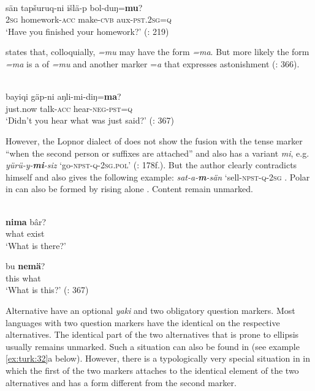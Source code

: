 \ea%
    \label{ex:turk:27}
    \\
    \gll sän  tapšuruq-ni    išlä-p    bol-duŋ=\textbf{{mu}}?\\
    2\textsc{sg}  homework-\textsc{acc} make-\textsc{cvb}  aux-\textsc{pst}.2\textsc{sg=q}\\
    \glt ‘Have you finished your homework?’ (\citealt{TuohutiLitifu2012}: 219)
    \z

\citet[56]{Shaw1878} states that, colloquially, \textit{=mu} may have the form \textit{=ma}. But more likely the form \textit{=ma} is a  of \textit{=mu} and another marker =\textit{a} that expresses astonishment (\citealt{TuohutiLitifu2012}: 366).

\ea%
    \label{ex:turk:28}
    \\
    \gll bayiqi    gäp-ni    aŋli-mi-diŋ=\textbf{{ma}}?\\
    just.now  talk-\textsc{acc}  hear-\textsc{neg}-\textsc{pst}=\textsc{q}\\
    \glt ‘Didn’t you hear what was just said?’ (\citealt{TuohutiLitifu2012}: 367)
    \z

However, the Lopnor dialect of  does not show the fusion with the tense marker “when the second person or  suffixes are attached” and also has a variant \textit{mi}, e.g. \textit{yürü-y-}\textbf{\textit{mi}}\textit{-siz} ‘go-\textsc{npst}-\textsc{q}-2\textsc{sg.pol}’ (\citealt{Abdurehim2014}: 178f.). But the author clearly contradicts himself and also gives the following example: \textit{sat-a-}\textbf{\textit{m}}\textit{-sän} ‘sell-\textsc{npst}-\textsc{q}-2\textsc{sg} \citep[208]{Abdurehim2014}. Polar  in  can also be formed by rising  alone \citep[208]{Abdurehim2014}. Content  remain unmarked.

\ea%
    \label{ex:turk:29}
    \\
    \ea
    \gll \textbf{{nima}} bâr?\\
    what  exist\\
    \glt ‘What is there?’ \citep[81]{Shaw1878}
    
    \ex
    \gll bu \textbf{{nemä}}?\\
    this  what\\
    \glt ‘What is this?’ (\citealt{TuohutiLitifu2012}: 367)
    \z
    \z

Alternative  have an optional  \textit{yaki} and two obligatory question markers. Most languages with two question markers have the identical  on the respective alternatives. The identical part of the two alternatives that is prone to ellipsis usually remains unmarked. Such a situation can also be found in  (see example \ref{ex:turk:32}a below). However, there is a typologically very special situation in  in which the first of the two markers attaches to the identical element of the two alternatives and has a form different from the second marker.

